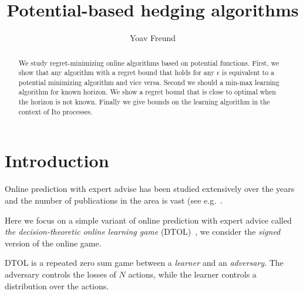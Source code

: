 \documentclass{article}[12pt]
\title{Potential-based hedging algorithms}
\author{Yoav Freund}
\begin{document}
\maketitle
\begin{abstract}
We study regret-minimizing online algorithms based on potential
functions. First, we show that any algorithm with a regret bound that
holds for any $\epsilon$ is equivalent to a potential minimizing
algorithm and vice versa. Second we should a min-max learning
algorithm for known horizon. We show a regret bound that is close to
optimal when the horizon is not known. Finally we give bounds on the
learning algorithm in the context of Ito processes.
\end{abstract}


\section{Introduction}
Online prediction with expert advise has been studied extensively over
the years and the number of publications in the area is vast (see
e.g.~\cite{vovk1990aggregating, feder1992universal,
  littlestone1994weighted, cesa1997use, cesa2006prediction}.

Here we focus on a simple variant of online prediction with expert
advice called {\em the decision-theoretic online learning game}
(DTOL)~\cite{freund1997decision}, we  consider the {\em
  signed} version of the online game.

DTOL is a repeated zero sum game between a {\em learner} and an {\em
  adversary}. The adversary controls the losses of $N$ actions, while
the learner controls a distribution over the actions.

\begin{figure}[ht!]
\end{figure}
\end{document}
